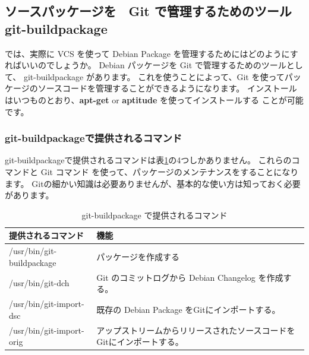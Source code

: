 \documentclass[mingoth,a4paper]{jsarticle}
\begin{document}
\subsection{ソースパッケージを　Git で管理するためのツール git-buildpackage}
では、実際に VCS を使って Debian Package を管理するためにはどのようにすればいいのでしょうか。
Debian パッケージを Git で管理するためのツールとして、 git-buildpackage があります。
これを使うことによって、Git を使ってパッケージのソースコードを管理することができるようになります。
インストールはいつものとおり、{\bf apt-get} or {\bf aptitude} を使ってインストールする
ことが可能です。


\subsubsection{git-buildpackageで提供されるコマンド}
git-buildpackageで提供されるコマンドは表\ref{git-buildpackage-command}の4つしかありません。
これらのコマンドと Git コマンド を使って、パッケージのメンテナンスをすることになります。
Gitの細かい知識は必要ありませんが、基本的な使い方は知っておく必要があります。
   \begin{table}[h]
    \begin{center}
      {
        \begin{tabular}{l|l} \hline
                提供されるコマンド & 機能 \\ \hline \hline
/usr/bin/git-buildpackage & パッケージを作成する \\
/usr/bin/git-dch & Git のコミットログから Debian Changelog を作成する。\\
/usr/bin/git-import-dsc & 既存の Debian Package をGitにインポートする。\\
/usr/bin/git-import-orig & アップストリームからリリースされたソースコードをGitにインポートする。\\
           \end{tabular}
        }
     \caption{git-buildpackage で提供されるコマンド}
     \label{git-buildpackage-command}
    \end{center}
    \end{table}
\end{document}
